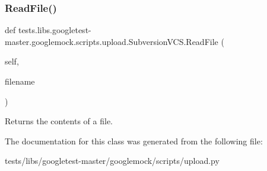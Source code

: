 \subsubsection{\texorpdfstring{Read\+File()}{ReadFile()}}
{\footnotesize\ttfamily def tests.\+libs.\+googletest-\/master.\+googlemock.\+scripts.\+upload.\+Subversion\+V\+C\+S.\+Read\+File (\begin{DoxyParamCaption}\item[{}]{self,  }\item[{}]{filename }\end{DoxyParamCaption})}

\begin{DoxyVerb}Returns the contents of a file.\end{DoxyVerb}
 

The documentation for this class was generated from the following file\+:\begin{DoxyCompactItemize}
\item 
tests/libs/googletest-\/master/googlemock/scripts/upload.\+py\end{DoxyCompactItemize}
